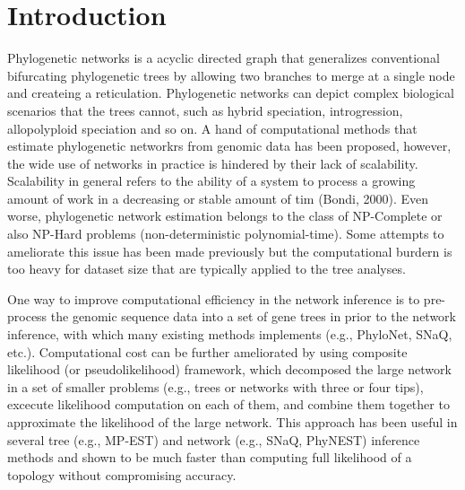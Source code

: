 \documentclass[unnumsec,webpdf,contemporary,large]{oup-authoring-template}%
\theoremstyle{thmstyleone}%
\theoremstyle{thmstyletwo}%
\theoremstyle{thmstylethree}%
\begin{document}
\maketitle

\section{Introduction}\label{sec1}
Phylogenetic networks is a acyclic directed graph that generalizes conventional bifurcating phylogenetic trees by allowing two branches to merge at a single node and createing a reticulation. Phylogenetic networks can depict complex biological scenarios that the trees cannot, such as hybrid speciation, introgression, allopolyploid speciation and so on. A hand of computational methods that estimate phylogenetic networkrs from genomic data has been proposed, however, the wide use of networks in practice is hindered by their lack of scalability. Scalability in general refers to the ability of a system to process a growing amount of work in a decreasing or stable amount of tim (Bondi, 2000). Even worse, phylogenetic network estimation belongs to the class of NP-Complete or also NP-Hard problems (non-deterministic polynomial-time). Some attempts to ameliorate this issue has been made previously but the computational burdern is too heavy for dataset size that are typically applied to the tree analyses.

One way to improve computational efficiency in the network inference is to pre-process the genomic sequence data into a set of gene trees in prior to the network inference, with which many existing methods implements (e.g., PhyloNet, SNaQ, etc.). Computational cost can be further ameliorated by using composite likelihood (or pseudolikelihood) framework, which decomposed the large network in a set of smaller problems (e.g., trees or networks with three or four tips), excecute likelihood computation on each of them, and combine them together to approximate the likelihood of the large network. This approach has been useful in several tree (e.g., MP-EST) and network (e.g., SNaQ, PhyNEST) inference methods and shown to be much faster than computing full likelihood of a topology without compromising accuracy.
\end{document}
